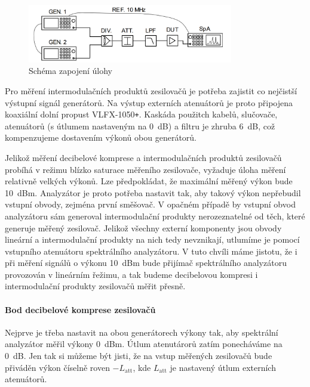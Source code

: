 \documentclass[11pt,a4paper]{article}
\newcommand{\plus}{{\texttt{+}}}
\begin{document}
\begin{figure}[!ht]
\begin{center}
    \includegraphics[width=0.8\textwidth]{src/connection-scheme.png}
\end{center}
\caption{Schéma zapojení úlohy}
\label{fig:connection-scheme}
\end{figure}

Pro měření intermodulačních produktů zesilovačů je potřeba zajistit co nejčistší výstupní signál generátorů. Na výstup externích atenuátorů je proto připojena koaxiální dolní propust VLFX-1050\plus. Kaskáda použitch kabelů, slučovače, atenuátorů (s útlumem nastaveným na 0~dB) a filtru je zhruba 6~dB, což kompenzujeme dostavením výkonů obou generátorů.

Jelikož měření decibelové komprese a intermodulačních produktů zesilovačů probíhá v režimu blízko saturace měřeního zesilovače, vyžaduje úloha měření relativně velkých výkonů. Lze předpokládat, že maximální měřený výkon bude 10~dBm. Analyzátor je proto potřeba nastavit tak, aby takový výkon nepřebudil vstupní obvody, zejména první směšovač. V opačném případě by vstupní obvod analyzátoru sám generoval intermodulační produkty nerozeznatelné od těch, které generuje měřený zesilovač. Jelikož všechny externí komponenty jsou obvody lineární a intermodulační produkty na nich tedy nevznikají, utlumíme je pomocí vstupního atenuátoru spektrálního analyzátoru. V tuto chvíli máme jistotu, že i při měření signálů o výkonu 10~dBm bude přijímač spektrálního analyzátoru provozován v lineárním řežimu, a tak budeme decibelovou kompresi i intermodulační produkty zesilovačů měřit přesně.

\paragraph*{Bod decibelové komprese zesilovačů}
Nejprve je třeba nastavit na obou generátorech výkony tak, aby spektrální analyzátor měřil výkony 0~dBm. Útlum atenutárorů zatím ponecháváme na 0~dB. Jen tak si můžeme být jisti, že na vstup měřených zesilovačů bude přiváděn výkon číselně roven $-L_{\mathrm{att}}$, kde $L_{\mathrm{att}}$ je nastavený útlum externích atenuátorů.
\end{document}
